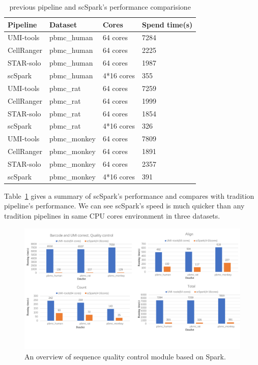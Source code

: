 \documentclass[conference]{IEEEtran}
\begin{document}
\begin{table}
	\centering
	\caption{previous pipeline and scSpark's performance comparisione}\label{tab1}
	\resizebox{0.45\textwidth}{!} {
	\begin{tabular}{l | l | l | l }
		\hline
		Pipeline & Dataset & Cores & Spend time(s) \\
		\hline
		UMI-tools & pbmc\_human & 64 cores & 7284 \\
		CellRanger & pbmc\_human & 64 cores & 2225 \\
		STAR-solo & pbmc\_human & 64 cores &  1987 \\
		scSpark & pbmc\_human & 4*16 cores & 355 \\
		UMI-tools & pbmc\_rat & 64 cores & 7259 \\
		CellRanger & pbmc\_rat & 64 cores & 1999 \\
		STAR-solo & pbmc\_rat & 64 cores &  1854 \\
		scSpark & pbmc\_rat & 4*16 cores & 326 \\
		UMI-tools & pbmc\_monkey & 64 cores & 7809 \\
		CellRanger & pbmc\_monkey & 64 cores & 1891 \\
		STAR-solo & pbmc\_monkey & 64 cores &  2357 \\
		scSpark & pbmc\_monkey & 4*16 cores & 391 \\
		\hline
	\end{tabular}
	}
\end{table}
Table~\ref{tab1} gives a summary of scSpark's performance and compares with tradition pipeline's performance.
We can see scSpark's speed is much quicker than any tradition pipelines in same CPU cores environment in three datasets.

\begin{figure}
	\includegraphics[width=\textwidth]{Fig4.pdf}
	\caption{An overview of sequence quality control module based on Spark.} \label{fig4}
\end{figure}
\end{document}
